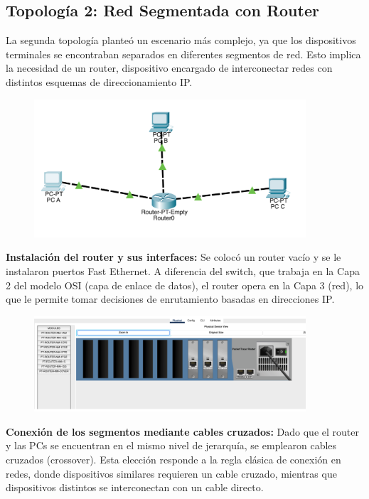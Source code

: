 \documentclass[letterpaper,12pt,oneside]{article}
\begin{document}
\subsection*{Topología 2: Red Segmentada con Router}
La segunda topología planteó un escenario más complejo, ya que los dispositivos terminales se encontraban separados en diferentes segmentos de red. Esto implica la necesidad de un router, dispositivo encargado de interconectar redes con distintos esquemas de direccionamiento IP.
\begin{figure}[h!]
    \centering
    \includegraphics[width=0.9\textwidth]{11.png}
\end{figure}

\textbf{Instalación del router y sus interfaces:}
Se colocó un router vacío y se le instalaron puertos Fast Ethernet. A diferencia del switch, que trabaja en la Capa 2 del modelo OSI (capa de enlace de datos), el router opera en la Capa 3 (red), lo que le permite tomar decisiones de enrutamiento basadas en direcciones IP.
\begin{figure}[h!]
    \centering
    \includegraphics[width=0.9\textwidth]{12.png}
\end{figure}

\textbf{Conexión de los segmentos mediante cables cruzados:}
Dado que el router y las PCs se encuentran en el mismo nivel de jerarquía, se emplearon cables cruzados (crossover). Esta elección responde a la regla clásica de conexión en redes, donde dispositivos similares requieren un cable cruzado, mientras que dispositivos distintos se interconectan con un cable directo.
\end{document}
